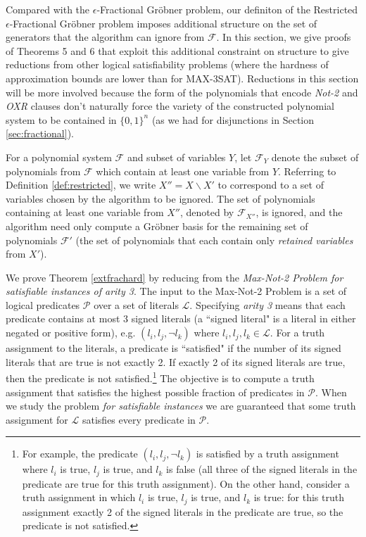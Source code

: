 \documentclass{article}
\newcommand{\F}[0]{\mathcal{F}}
\newcommand{\ep}[0]{\epsilon}
\begin{document}
Compared with the $\ep$\nobreakdash-Fractional Gr\"{o}bner problem, our definiton of the  Restricted $\ep$\nobreakdash-Fractional Gr\"{o}bner problem  imposes additional structure on the set of generators that the algorithm can ignore from $\F$. In this section, we give proofs of Theorems 5 and 6 that exploit this additional constraint on structure to give reductions from other logical satisfiability problems (where the hardness of approximation bounds are lower than for MAX-3SAT). 
Reductions in this section will be more involved because the form of the polynomials that encode \textit{Not-2} and \textit{OXR} clauses don't naturally force the variety of the constructed polynomial system to be contained in $\{0,1\}^n$ (as we had for disjunctions in Section \ref{sec:fractional}). 





For a polynomial system $\F$ and subset of variables $Y$, let $\F_Y$ denote the subset of polynomials from $\F$ which contain at least one variable from $Y$.
Referring to Definition \ref{def:restricted}, we write  $X''=X\backslash X'$ to correspond to a set of variables chosen by the algorithm to be ignored. The set of polynomials containing at least one variable from $X''$, denoted by $\F_{X''}$, is ignored, and the algorithm need only compute a Gr\"{o}bner basis for the remaining set of polynomials $\mathcal{F}'$ (the set of polynomials that each contain only \textit{retained variables} from $X'$). 




We prove Theorem \ref{extfrachard} by reducing from the \textit{Max-Not-2 Problem for satisfiable instances of arity 3}. The input to the Max-Not-2 Problem is a set of logical predicates $\mathcal{P}$ over a set of literals $\mathcal{L}$. Specifying \textit{arity 3} means that each predicate contains at most 3 signed literals (a ``signed literal" is a literal in either negated or positive form), e.g. $(l_i,l_j,\neg l_k)$ where $l_i, l_j,l_k\in \mathcal{L}$. For a truth assignment to the literals, a predicate is ``satisfied" if the number of its signed literals that are true is not exactly 2. If exactly 2 of its signed literals are true, then the predicate is not satisfied.\footnote{For example, the predicate $(l_i,l_j,\neg l_k)$ is satisfied by a truth assignment where $l_i$ is true, $l_j$ is true, and $l_k $ is false (all three of the signed literals in the predicate are true for this truth assignment). On the other hand, consider a truth assignment in which $l_i$ is true, $l_j$ is true, and $l_k$ is true: for this truth assignment exactly 2 of the signed literals in the predicate are true, so the predicate is not satisfied.} The objective is to compute a truth assignment that satisfies the highest possible fraction of predicates in $\mathcal{P}$. When we study the problem \textit{for satisfiable instances} we are guaranteed that some truth assignment for $\mathcal{L}$ satisfies every predicate in $\mathcal{P}$.
\end{document}
